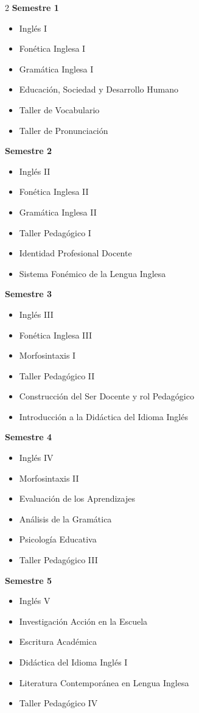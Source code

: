 \documentclass[12pt,a4paper]{article}
\begin{document}
	\begin{multicols}{2}
		\textbf{Semestre 1}
		\begin{itemize}
			\item Inglés I
			\item Fonética Inglesa I
			\item Gramática Inglesa I
			\item Educación, Sociedad y Desarrollo Humano
			\item Taller de Vocabulario
			\item Taller de Pronunciación
		\end{itemize}
		
		\textbf{Semestre 2}
		\begin{itemize}
			\item Inglés II
			\item Fonética Inglesa II
			\item Gramática Inglesa II
			\item Taller Pedagógico I
			\item Identidad Profesional Docente
			\item Sistema Fonémico de la Lengua Inglesa
		\end{itemize}
		
		\textbf{Semestre 3}
		\begin{itemize}
			\item Inglés III
			\item Fonética Inglesa III
			\item Morfosintaxis I
			\item Taller Pedagógico II
			\item Construcción del Ser Docente y rol Pedagógico
			\item Introducción a la Didáctica del Idioma Inglés
		\end{itemize}
		
		\textbf{Semestre 4}
		\begin{itemize}
			\item Inglés IV
			\item Morfosintaxis II
			\item Evaluación de los Aprendizajes
			\item Análisis de la Gramática
			\item Psicología Educativa
			\item Taller Pedagógico III
		\end{itemize}
		
		\textbf{Semestre 5}
		\begin{itemize}
			\item Inglés V
			\item Investigación Acción en la Escuela
			\item Escritura Académica
			\item Didáctica del Idioma Inglés I
			\item Literatura Contemporánea en Lengua Inglesa
			\item Taller Pedagógico IV
		\end{itemize}
		

\end{multicols}
\end{document}
